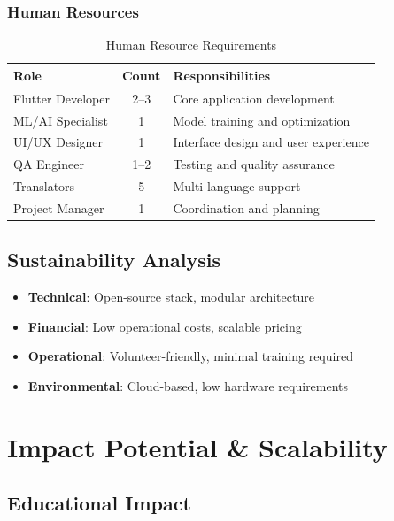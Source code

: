 \documentclass[12pt,a4paper]{article}
\begin{document}
\subsubsection{Human Resources}
\begin{table}[H]
\centering
\small
\begin{tabularx}{\textwidth}{|l|c|X|}
\hline
\rowcolor{lightgray}
\textbf{Role} & \textbf{Count} & \textbf{Responsibilities} \\
\hline
Flutter Developer & 2--3 & Core application development \\
\hline
ML/AI Specialist & 1 & Model training and optimization \\
\hline
UI/UX Designer & 1 & Interface design and user experience \\
\hline
QA Engineer & 1--2 & Testing and quality assurance \\
\hline
Translators & 5 & Multi-language support \\
\hline
Project Manager & 1 & Coordination and planning \\
\hline
\end{tabularx}
\caption{Human Resource Requirements}
\end{table}

\subsection{Sustainability Analysis}
\begin{itemize}[leftmargin=*, itemsep=0.2em]
    \item \textbf{Technical}: Open-source stack, modular architecture
    \item \textbf{Financial}: Low operational costs, scalable pricing
    \item \textbf{Operational}: Volunteer-friendly, minimal training required
    \item \textbf{Environmental}: Cloud-based, low hardware requirements
\end{itemize}

\newpage

\section{Impact Potential \& Scalability}

\subsection{Educational Impact}
\end{document}
